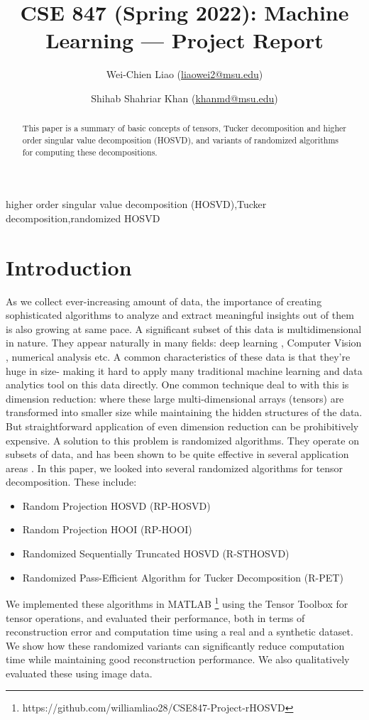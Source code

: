 \documentclass[preprint]{elsarticle}
\title{\textbf{\large{CSE 847 (Spring 2022): Machine Learning --- Project Report}}}
\author[1]{Wei-Chien Liao (\href{mailto:liaowei2@msu.edu}{liaowei2@msu.edu})}
\author[1]{Shihab Shahriar Khan (\href{mailto:khanmd@msu.edu}{khanmd@msu.edu})}
\date{}
\begin{document}
\begin{frontmatter}
\begin{abstract}
    This paper is a summary of basic concepts of tensors, Tucker decomposition and higher order singular value decomposition (HOSVD), and variants
    of randomized algorithms for computing these decompositions.
\end{abstract}
\begin{keyword}
    higher order singular value decomposition (HOSVD)\sep Tucker decomposition\sep randomized HOSVD
\end{keyword}
\end{frontmatter}
\section{Introduction}
\noindent As we collect ever-increasing amount of data, the importance of creating sophisticated algorithms
to analyze and extract meaningful insights out of them is also growing at same pace. A significant subset of
this data is multidimensional in nature. They appear naturally in many fields: deep learning \cite{bacciu2020tensor},
Computer Vision \cite{vasilescu2002multilinear}, numerical analysis \cite{beylkin2002numerical} etc. A common 
characteristics of these data is that they're huge in size- making it hard to apply many traditional machine learning
and data analytics tool on this data directly.
\vskip0.3cm
\noindent One common technique deal to with this is dimension reduction: where these large multi-dimensional arrays
(tensors) are transformed into smaller size while maintaining the hidden structures of the data. But straightforward
application of even dimension reduction can be prohibitively expensive. A solution to this problem is randomized algorithms.
They operate on subsets of data, and has been shown to be quite effective in several application areas
\cite{savas2003analyses, vasilescu2002multilinear, beylkin2002numerical}.
\vskip0.3cm
\noindent In this paper, we looked into several randomized algorithms for tensor decomposition. These include:
\begin{itemize}
    \item Random Projection HOSVD (RP-HOSVD)
    \item Random Projection HOOI (RP-HOOI)
    \item Randomized Sequentially Truncated HOSVD (R-STHOSVD)
    \item Randomized Pass-Efficient Algorithm for Tucker Decomposition (R-PET)
\end{itemize}
\noindent We implemented these algorithms in MATLAB \footnote{https://github.com/williamliao28/CSE847-Project-rHOSVD} using the Tensor
Toolbox \cite{Brett2021} for tensor operations, and evaluated their performance, both in terms of reconstruction error and computation time using a real
and a synthetic dataset. We show how these randomized variants can significantly reduce computation time while maintaining good reconstruction
performance. We also qualitatively evaluated these using image data.
\end{document}
